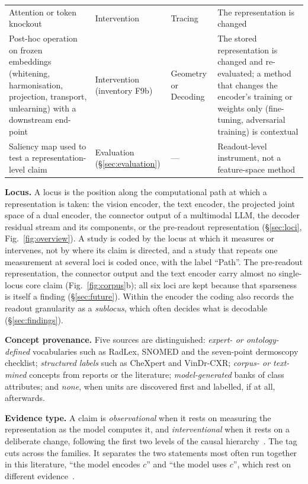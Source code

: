 \begin{table}[!tb]
\begin{tabular}{@{}L{5.4cm}L{2.8cm}L{1.9cm}L{5.2cm}@{}}
Attention or token knockout & Intervention & Tracing & The representation is changed \\
Post-hoc operation on frozen embeddings (whitening, harmonisation, projection, transport, unlearning) with a downstream end-point & Intervention (inventory F9b) & Geometry or Decoding & The stored representation is changed and re-evaluated; a method that changes the encoder's training or weights only (fine-tuning, adversarial training) is contextual \\
Saliency map used to test a representation-level claim & Evaluation (\S\ref{sec:evaluation}) & --- & Readout-level instrument, not a feature-space method \\
\bottomrule
\end{tabular}
\end{table}

\textbf{Locus.} A locus is the position along the computational path at which a representation is
taken: the vision encoder, the text encoder, the projected joint space of a dual encoder, the connector
output of a multimodal LLM, the decoder residual stream and its components, or the pre-readout
representation (\S\ref{sec:loci}, Fig.~\ref{fig:overview}). A study is coded by the locus at which it
measures or intervenes, not by where its claim is directed, and a study that repeats one measurement at
several loci is coded once, with the label ``Path''. The pre-readout representation, the connector
output and the text encoder carry almost no single-locus core claim (Fig.~\ref{fig:corpus}b); all six
loci are kept because that sparseness is itself a finding (\S\ref{sec:future}). Within the encoder the
coding also records the readout granularity as a \emph{sublocus}, which often decides what is decodable
(\S\ref{sec:findings}).

\textbf{Concept provenance.} Five sources are distinguished: \emph{expert- or ontology-defined}
vocabularies such as RadLex, SNOMED and the seven-point dermoscopy checklist; \emph{structured labels}
such as CheXpert and VinDr-CXR; \emph{corpus- or text-mined} concepts from reports or the literature;
\emph{model-generated} banks of class attributes; and \emph{none}, when units are discovered first and
labelled, if at all, afterwards.

\textbf{Evidence type.} A claim is \emph{observational} when it rests on measuring the representation
as the model computes it, and \emph{interventional} when it rests on a deliberate change, following the
first two levels of the causal hierarchy~\cite{bareinboim2022pearl}. The tag cuts across the families. It
separates the two statements most often run together in this literature, ``the model encodes $c$'' and
``the model uses $c$'', which rest on different
evidence~\cite{hewitt2019designing,elazar2020amnesic,ravfogel2020null}.

